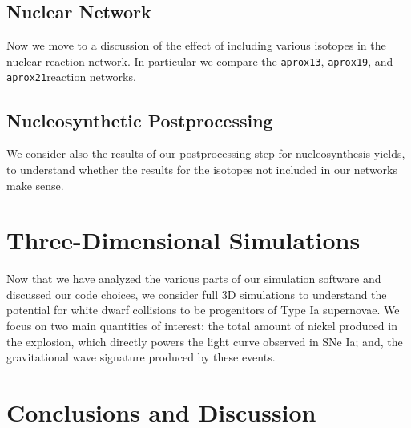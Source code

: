 \documentclass[twocolumn,numberedappendix]{../aastex6}
\newcommand{\aproxthirteen}{\texttt{aprox13}}
\newcommand{\aproxnineteen}{\texttt{aprox19}}
\newcommand{\aproxtwentyone}{\texttt{aprox21}}
\begin{document}
\subsection{Nuclear Network}
\label{sec:2D:network}

Now we move to a discussion of the effect of including various isotopes
in the nuclear reaction network. In particular we compare the \aproxthirteen,
\aproxnineteen, and \aproxtwentyone reaction networks.

\subsection{Nucleosynthetic Postprocessing}
\label{sec:2D:postprocessing}

We consider also the results of our postprocessing step for nucleosynthesis
yields, to understand whether the results for the isotopes not included in
our networks make sense.



\section{Three-Dimensional Simulations}
\label{sec:3D}

Now that we have analyzed the various parts of our simulation software and
discussed our code choices, we consider full 3D simulations to understand
the potential for white dwarf collisions to be progenitors of Type Ia
supernovae. We focus on two main quantities of interest: the total amount of
nickel produced in the explosion, which directly powers the light curve
observed in SNe Ia; and, the gravitational wave signature produced by
these events.


\section{Conclusions and Discussion}\label{Sec:Conclusions and Discussion}
\label{sec:conclusion}


\acknowledgments
\end{document}
